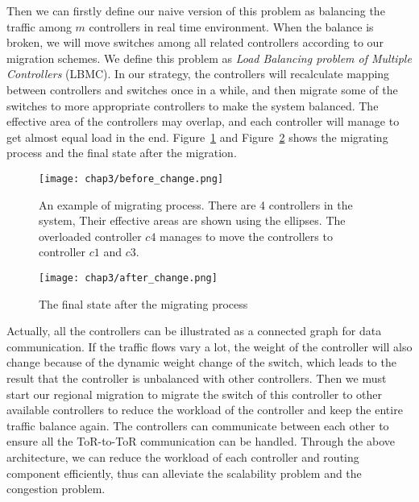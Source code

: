 Then we can firstly define our naive version of this problem as balancing the traffic among $m$ controllers in real time environment. When the balance is broken, we will move switches among all related controllers according to our migration schemes. We define this problem as \emph{Load Balancing problem of Multiple Controllers} (LBMC). In our strategy, the controllers will recalculate mapping between controllers and switches once in a while, and then migrate some of the switches to more appropriate controllers to make the system balanced. The effective area of the controllers may overlap, and each controller will manage to get almost equal load in the end. Figure~\ref{before} and Figure~\ref{after} shows the migrating process and the final state after the migration.
\begin{figure}[htbp]
  \centering
  \texttt{[image: chap3/before\_change.png]}
  \caption{An example of migrating process. There are 4 controllers in the system, Their effective areas are shown using the ellipses. The overloaded controller $c4$ manages to move the controllers to controller $c1$ and $c3$.}\label{before}
\end{figure}
\begin{figure}[htbp]
  \centering
  \texttt{[image: chap3/after\_change.png]}
  \caption{The final state after the migrating process}\label{after}
\end{figure}

Actually, all the controllers can be illustrated as a connected graph for data communication. If the traffic flows vary a lot, the weight of the controller will also change because of the dynamic weight change of the switch, which leads to the result that the controller is unbalanced with other controllers. Then we must start our regional migration to migrate the switch of this controller to other available controllers to reduce the workload of the controller and keep the entire traffic balance again. The controllers can communicate between each other to ensure all the ToR-to-ToR communication can be handled. Through the above architecture, we can reduce the workload of each controller and routing component efficiently, thus can alleviate the scalability problem and the congestion problem.

